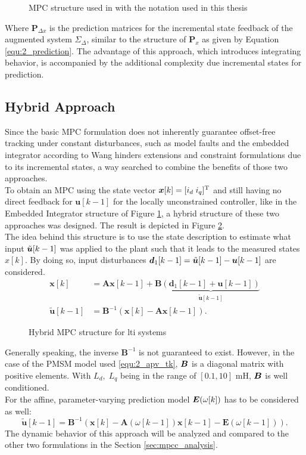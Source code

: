 \begin{figure}[H]
	\centering
	
	\caption{MPC structure used in \cite{mpcWang} with the notation used in this thesis}
	\label{fig:Wang_MPC}
\end{figure}
Where $ \mathcal{\bm P}_{\Delta x}$ is the prediction matrices for the incremental state feedback of the augmented system $\Sigma_\Delta$, similar to the structure of $\bm{P}_x$ as given by Equation \eqref{equ:2_prediction}. 
The advantage of this approach, which introduces integrating behavior, is accompanied by the additional complexity due incremental states for prediction.

\subsection{Hybrid Approach}\label{sec:mpcc_mpc_hybrid}
Since the basic MPC formulation does not inherently guarantee offset-free tracking under constant disturbances, such as model faults and the embedded integrator according to Wang hinders extensions and constraint formulations due to its incremental states, a way searched to combine the benefits of those two approaches. \\
To obtain an MPC using the state vector ${\bm{x}}[k] = [i_{d}\; i_{q}]^{\mathrm{T}}$ and still having no direct feedback for $\bm{u}[k-1]$ for the locally unconstrained controller, like in the Embedded Integrator structure of Figure \ref{fig:Wang_MPC}, a hybrid structure of these two approaches was designed. The result is depicted in Figure \ref{fig:Hybrid_MPC}.
\\
The idea behind this structure is to use the state description to estimate what input $\Tilde{{\bm{u}}}[k-1]$ was applied to the plant such that it leads to the measured states $x[k]$. By doing so, input disturbances $\bm{d}_1[k-1] = \Tilde{{\bm{u}}}[k-1] - {{\bm{u}}}[k-1]$ are considered. 
\begin{equation*}
	\begin{split}
		\bm{x}[k]
		&= \bm{A}\bm{x}[k-1]
		+ \bm{B}
		\underbrace{
			\left(
			\bm{d}_1[k-1] + \bm{u}[k-1]
			\right)
		}_{\tilde{\bm{u}}[k-1]}
		\\
		\tilde{\bm{u}}[k-1]
		&= \bm{B}^{-1}
		\left(
		\bm{x}[k] - \bm{A}\bm{x}[k-1]
		\right).
	\end{split}
\end{equation*}
\begin{figure}[H]
	\centering
	
	\caption{Hybrid MPC structure for \acrshort{lti} systems}
	\label{fig:Hybrid_MPC}
\end{figure}
Generally speaking, the inverse $\bm{B}^{-1}$ is not guaranteed to exist. However, in the case of the PMSM model used \eqref{equ:2_apv_tk}, $\bm{B}$ is a diagonal matrix with positive elements. With $L_d,\; L_q$ being in the range of $[0.1, 10]$ mH, $\bm{B}$ is well conditioned.\\
For the affine, parameter-varying prediction model $\bm{E}(\omega[k])$ has to be considered as well:
\[
\tilde{\bm{u}}[k-1] = \bm{B}^{-1} \left( \bm{x}[k] - \bm{A}(\omega[k-1])\bm{x}[k-1] - \bm{E}(\omega[k-1]) \right).
\]
The dynamic behavior of this approach will be analyzed and compared to the other two formulations in the Section \ref{sec:mpcc_analysis}.

